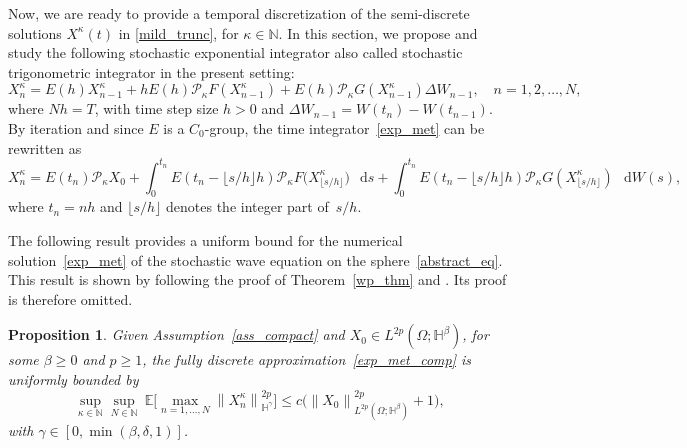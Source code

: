 \documentclass[a4paper]{amsart}
\newtheorem{prop}[thm]{Proposition}
\theoremstyle{remark}
\theoremstyle{definition}
\newcommand{\HH}{\mathbb{H}}
\newcommand*\dd{\mathop{}\!\mathrm{d}}
\newcommand{\floor}[1]{\lfloor #1 \rfloor}
\begin{document}
Now, we are ready to provide a temporal discretization of the semi-discrete solutions $X^\kappa(t)$ in \eqref{mild_trunc}, for $\kappa\in\mathbb{N}$. In this section, we propose and study the following stochastic exponential integrator also called stochastic trigonometric integrator in the present setting:
\begin{equation}
\label{exp_met}
X_n^\kappa =E(h)X_{n-1}^{\kappa}+h E(h)\mathcal{P}_\kappa F(X_{n-1}^\kappa)+E(h) \mathcal{P}_\kappa G(X_{n-1}^\kappa) \Delta W_{n-1}, \quad n=1,2,\dots,N,
\end{equation}
where $Nh=T$, with time step size $h>0$ and $\Delta W_{n-1}=W(t_n)-W(t_{n-1})$. By iteration and since $E$ is a $C_0$-group, the time integrator~\eqref{exp_met} can be rewritten as 
\begin{equation}
\label{exp_met_comp}
X_n^\kappa 
    = E(t_n)\mathcal{P}_\kappa X_0
        +\int_{0}^{t_n} E(t_n-\floor{s/h}h)\mathcal{P}_\kappa F\big(X^\kappa_{\floor{s/h}}\big)\,\dd s
        +\int_{0}^{t_n} E(t_n-\floor{s/h}h)\mathcal{P}_\kappa G(X^\kappa_{\floor{s/h}})\, \dd W(s),
\end{equation}
where $t_n = nh$ and $\floor{s/h}$ denotes the integer part of~$s/h$.

The following result provides a uniform bound for the numerical solution~\eqref{exp_met} of the stochastic wave equation on the sphere~\eqref{abstract_eq}. This result is shown by following the proof of Theorem~\ref{wp_thm} and \cite[Proposition~3.1]{MR3353942}. Its proof is therefore omitted.
\begin{prop}
\label{prop_bound_fully_discr}
Given Assumption~\ref{ass_compact} and $X_0\in L^{2p}\left(\Omega; {\HH}^\beta\right)$, for some $\beta\ge0$ and $p\ge 1$, the fully discrete approximation~\eqref{exp_met_comp} is uniformly bounded by
\begin{equation*}
\sup_{\kappa\in\mathbb{N}} \sup_{N\in\mathbb{N}} \ \mathbb{E}\bigg[\max_{n=1,\dots,N}\left\|X^\kappa_{n}\right\|^{2p}_{\HH^\gamma}\bigg]\le c\bigg(\left\|X_0\right\|^{2p}_{L^{2p}(\Omega; \HH^\beta)}+1\bigg),
\end{equation*}
with $\gamma \in [0,\min(\beta,\delta,1)]$.
\end{prop}
    
\end{document}
